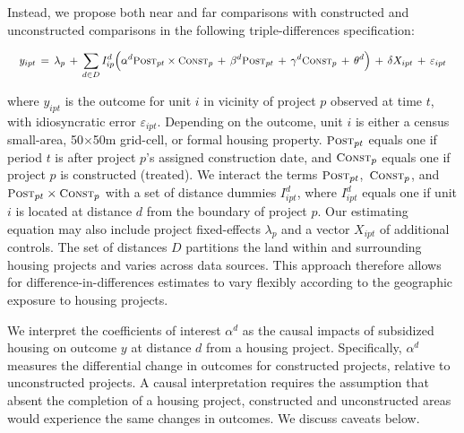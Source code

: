 \documentclass[12pt]{article}
\begin{document}

Instead, we propose both near and far comparisons with constructed and unconstructed comparisons in the following triple-differences specification:

\begin{equation}\label{eq:main}
\quad y_{ipt} \, = \, \lambda_{p} \,+\, \sum\limits_{d\in D} I^d_{ip}\Big( \alpha^d \textsc{\small Post}_{pt}\times\textsc{\small Const}_{p} \, + \, \beta^d\textsc{\small Post}_{pt} \, + \, \gamma^d\textsc{\small Const}_{p} \, + \, \theta^{d} \Big) \, + \, \delta X_{ipt} \, + \, \varepsilon_{ipt} \quad 
\end{equation}

\noindent where $y_{ipt}$ is the outcome for unit $i$ in vicinity of project $p$ observed at time $t$, with idiosyncratic error $\varepsilon_{ipt}$. Depending on the outcome, unit $i$ is either a census small-area, 50$\times$50m grid-cell, or formal housing property.  $\textsc{\small Post}_{pt}$ equals one if period $t$ is after project $p$'s assigned construction date, and $\textsc{\small Const}_{p}$ equals one if project $p$ is constructed (treated). We interact the terms $\textsc{\small Post}_{pt}$, $\,\textsc{\small Const}_{p}$, and $\textsc{\small Post}_{pt}\times\textsc{\small Const}_{p}$ with a set of distance dummies $I^d_{ipt}$, where $I^d_{ipt}$ equals one if unit $i$ is located at distance $d$ from the boundary of project $p$. Our estimating equation may also include project fixed-effects $\lambda_{p}$ and a vector $X_{ipt}$ of additional controls. The set of distances $D$ partitions the land within and surrounding housing projects and varies across data sources. This approach therefore allows for difference-in-differences estimates to vary flexibly according to the geographic exposure to housing projects.
 
We interpret the coefficients of interest $\alpha^d$ as the causal impacts of subsidized housing on outcome $y$ at distance $d$ from a housing project. Specifically, $\alpha^d$ measures the differential change in outcomes for constructed projects, relative to unconstructed projects.  A causal interpretation requires the assumption that absent the completion of a housing project, constructed and unconstructed areas would experience the same changes in outcomes. We discuss caveats below.
\end{document}
